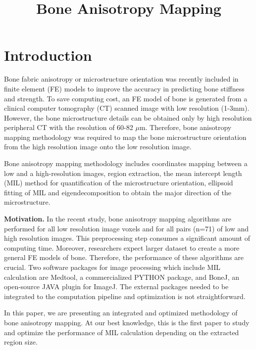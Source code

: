 \documentclass[letterpaper]{article}
\title{Bone Anisotropy Mapping}
\newcommand{\mypar}[1]{{\bf #1.}}
\begin{document}
%
\maketitle
%

\begin{abstract}
\color{red}{Todo}
\end{abstract}

\section{Introduction}\label{sec:intro}

Bone fabric anisotropy or microstructure orientation was recently included in finite element (FE) models to improve the accuracy in predicting bone stiffness and strength. To save computing cost, an FE model of bone is generated from a clinical computer tomography (CT) scanned image with low resolution (1-3mm). However, the bone microstructure details can be obtained only by high resolution peripheral CT with the resolution of 60-82 $\mu$m. Therefore, bone anisotropy mapping methodology was required to map the bone microstructure orientation from the high resolution image onto the low resolution image.

Bone anisotropy mapping methodology includes coordinates mapping between a low and a high-resolution images, region extraction, the mean intercept length (MIL) method for quantification of the microstructure orientation, ellipsoid fitting of MIL and eigendecomposition to obtain the major direction of the microstructure.

\mypar{Motivation} In the recent study, bone anisotropy mapping algorithms are performed for all low resolution image voxels and for all pairs (n=71) of low and high resolution images. This preprocessing step consumes a significant amount of computing time. Moreover, researchers expect larger dataset to create a more general FE models of bone. Therefore, the performance of these algorithms are crucial. Two software packages for image processing which include MIL calculation are Medtool, a commercialized PYTHON package, and BoneJ, an open-source JAVA plugin for ImageJ. The external packages needed to be integrated to the computation pipeline and optimization is not straightforward. 

In this paper, we are presenting an integrated and optimized methodology of bone anisotropy mapping. At our best knowledge, this is the first paper to study and optimize the performance of MIL calculation depending on the extracted region size.
  
\end{document}
